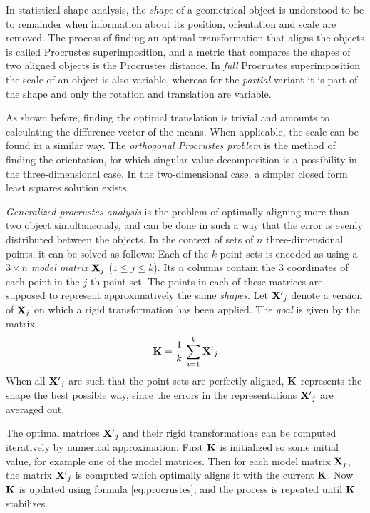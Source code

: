 In statistical shape analysis, the \emph{shape} of a geometrical object is understood to be to remainder when information about its position, orientation and scale are removed. The process of finding an optimal transformation that aligns the objects is called Procrustes superimposition, and a metric that compares the shapes of two aligned objects is the Procrustes distance. In \emph{full} Procrustes superimposition the scale of an object is also variable, whereas for the \emph{partial} variant it is part of the shape and only the rotation and translation are variable. 

As shown before, finding the optimal translation is trivial and amounts to calculating the difference vector of the means. When applicable, the scale can be found in a similar way. The \emph{orthogonal Procrustes problem} is the method of finding the orientation, for which singular value decomposition is a possibility in the three-dimensional case. In the two-dimensional case, a simpler closed form least squares solution exists.

\emph{Generalized procrustes analysis} is the problem of optimally aligning more than two object simultaneously, and can be done in such a way that the error is evenly distributed between the objects.
 In the context of sets of $n$ three-dimensional points, it can be solved as follows: Each of the $k$ point sets is encoded as using a $3 \times n$ \emph{model matrix} $\mathbf{X}_j$ ($1 \leq j \leq k$). Its $n$ columns contain the $3$ coordinates of each point in the $j$-th point set. The points in each of these matrices are supposed to represent approximatively the same \emph{shapes}. Let $\mathbf{X'}_j$ denote a version of $\mathbf{X}_j$ on which a rigid transformation has been applied. The \emph{goal} is given by the matrix
\begin{equation} \label{eq:procrustes}
\mathbf{K} = \frac{1}{k} \, \sum_{i=1}^{k} \mathbf{X'}_j
\end{equation}
When all $\mathbf{X'}_j$ are such that the point sets are perfectly aligned, $\mathbf{K}$ represents the shape the best possible way, since the errors in the representations $\mathbf{X'}_j$ are averaged out.

The optimal matrices $\mathbf{X'}_j$ and their rigid transformations can be computed iteratively by numerical approximation: \cite{Told2010} First $\mathbf{K}$ is initialized so some initial value, for example one of the model matrices. Then for each model matrix $\mathbf{X}_j$, the matrix $\mathbf{X'}_j$ is computed which optimally aligns it with the current $\mathbf{K}$. Now $\mathbf{K}$ is updated using formula \ref{eq:procrustes}, and the process is repeated until $\mathbf{K}$ stabilizes.


